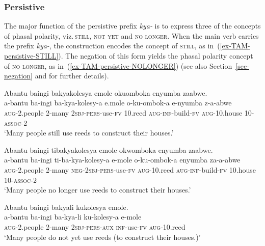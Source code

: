 \subsubsection{Persistive} \label{sec-aspect-persisitive}

The major function of the persistive prefix \textit{kya-} is to express three of the concepts of phasal polarity, viz.\,\textsc{still}, \textsc{not yet} and \textsc{no longer}. 
When the main verb carries the prefix \textit{kya-}, the construction encodes the concept of \textsc{still}, as in~(\ref{ex-TAM-persistive-STILL}). 
The negation of this form yields the phasal polarity concept of \textsc{no longer}, as in~(\ref{ex-TAM-persistive-NOLONGER}) (see also Section~\ref{sec-negation} and \citealt{Molochieva2018Phasal} for further details). 


\ea \label{ex-TAM-persistive}
\begin{xlist}
\ex	\label{ex-TAM-persistive-STILL}
	\glll Abantu		baingi	bakyakolesya	emole 		okuomboka	enyumba	zaabwe.\\
	a-bantu		ba-ingi	ba-kya-kolesy-a 	e.mole 		o-ku-ombok-a	e-nyumba	z-a-abwe	\\
	\textsc{aug}-2.people	2-many	\textsc{2sbj}-\textsc{pers}-use-\textsc{fv}	  10.reed 	\textsc{aug}-\textsc{inf}-build-\textsc{fv}	\textsc{aug}-10.house	10-\textsc{assoc}-2\\
\glt  ‘Many people still use reeds to construct their houses.’

\ex 		\label{ex-TAM-persistive-NOLONGER}
	\glll Abantu	baingi	tibakyakolesya	emole { }{ } okwomboka	enyumba	zaabwe.\\
	a-bantu	ba-ingi	ti-ba-kya-kolesy-a	e-mole { }{ } o-ku-ombok-a	enyumba	za-a-abwe\\
	\textsc{aug}-2.people	2-many	\textsc{neg}-\textsc{2sbj}-\textsc{pers}-use-\textsc{fv}	\textsc{aug}-10.reed { }{ } \textsc{aug}-\textsc{inf}-build-\textsc{fv}	10.house	10-\textsc{assoc}-2\\
\glt ‘Many people no longer use reeds to construct their houses.'

\ex 	\label{ex-TAM-persistive-NOTYET}
	\glll Abantu	baingi	bakyali	kukolesya	emole.\\
	a-bantu	ba-ingi	ba-kya-li	ku-kolesy-a	e-mole\\
	\textsc{aug}-2.people	2-many	\textsc{2sbj}-\textsc{pers}-\textsc{aux}	\textsc{inf}-use-\textsc{fv}	\textsc{aug}-10.reed\\
\glt ‘Many people do not yet use reeds (to construct their houses.)'
\end{xlist}
\z


